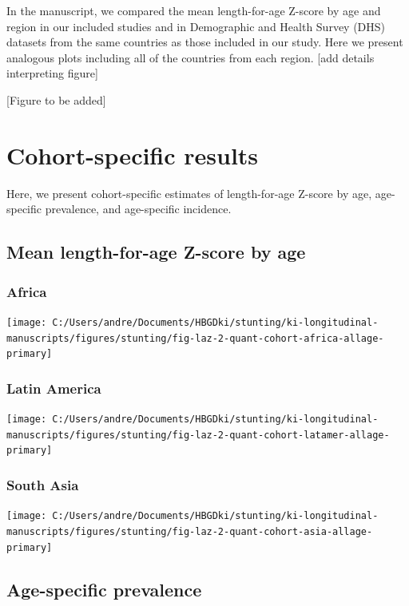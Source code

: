 \documentclass[9pt,]{book}
\begin{document}
\raggedright

In the manuscript, we compared the mean length-for-age Z-score by age
and region in our included studies and in Demographic and Health Survey
(DHS) datasets from the same countries as those included in our study.
Here we present analogous plots including all of the countries from each
region. {[}add details interpreting figure{]}

{[}Figure to be added{]}

\chapter{Cohort-specific results}\label{cohort}

\raggedright

Here, we present cohort-specific estimates of length-for-age Z-score by
age, age-specific prevalence, and age-specific incidence.

\section{Mean length-for-age Z-score by
age}\label{mean-length-for-age-z-score-by-age}

\subsection{Africa}\label{africa}

\texttt{[image: C:/Users/andre/Documents/HBGDki/stunting/ki-longitudinal-manuscripts/figures/stunting/fig-laz-2-quant-cohort-africa-allage-primary]}

\subsection{Latin America}\label{latin-america}

\texttt{[image: C:/Users/andre/Documents/HBGDki/stunting/ki-longitudinal-manuscripts/figures/stunting/fig-laz-2-quant-cohort-latamer-allage-primary]}

\subsection{South Asia}\label{south-asia}

\texttt{[image: C:/Users/andre/Documents/HBGDki/stunting/ki-longitudinal-manuscripts/figures/stunting/fig-laz-2-quant-cohort-asia-allage-primary]}

\section{Age-specific prevalence}\label{age-specific-prevalence}
\end{document}
